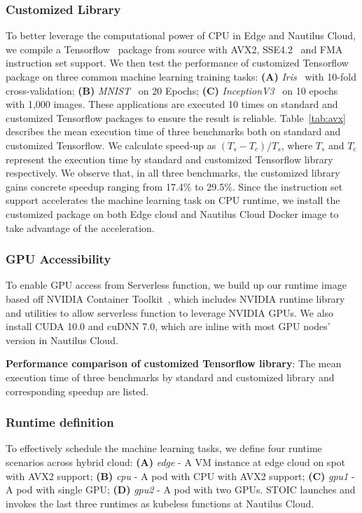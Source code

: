  \BlankLine
 \subsubsection{Customized Library}
 To better leverage the computational power of CPU in Edge and Nautilus Cloud, we compile a Tensorflow~\cite{ref:tensorflow} package from source with AVX2, SSE4.2~\cite{ref:avx} and FMA~\cite{ref:fma} instruction set support. We then test the performance of customized Tensorflow package on three common machine learning training tasks: \textbf{(A)} \textit{Iris}~\cite{ref:iris} with 10-fold cross-validation; \textbf{(B)} \textit{MNIST}~\cite{ref:mnist} on 20 Epochs; \textbf{(C)} \textit{InceptionV3}~\cite{ref:v3} on 10 epochs with 1,000 images. These applications are executed 10 times on standard and customized Tensorflow packages to ensure the result is reliable. Table~\ref{tab:avx} describes the mean execution time of three benchmarks both on standard and customized Tensorflow. We calculate speed-up as $(T_s - T_c) / T_s$, where $T_s$ and $T_c$ represent the execution time by standard and customized Tensorflow library respectively. We observe that, in all three benchmarks, the customized library gains concrete speedup ranging from 17.4\% to 29.5\%. Since the instruction set support accelerates the machine learning task on CPU runtime, we install the customized package on both Edge cloud and Nautilus Cloud Docker image to take advantage of the acceleration.
 
 \BlankLine
 \subsubsection{GPU Accessibility}
 To enable GPU access from Serverless function, we build up our runtime image based off NVIDIA Container Toolkit~\cite{ref:nvidia}, which includes NVIDIA runtime library and utilities to allow serverless function to leverage NVIDIA GPUs. We also install CUDA 10.0 and cuDNN 7.0, which are inline with most GPU nodes' version in Nautilus Cloud. 
 
\begin{table}[]
\centering

\caption{\textbf{Performance comparison of customized Tensorflow library}: The mean execution time of three benchmarks by standard and customized library and corresponding speedup are listed.  }
\label{tab:avx}
\end{table}
 
 \BlankLine
 \subsubsection{Runtime definition}
 To effectively schedule the machine learning tasks, we define four runtime scenarios across hybrid cloud: \textbf{(A)} \textit{edge} - A VM instance at edge cloud on spot with AVX2 support; \textbf{(B)} \textit{cpu} - A pod with CPU with AVX2 support; \textbf{(C)} \textit{gpu1} - A pod with single GPU; \textbf{(D)} \textit{gpu2} - A pod with two GPUs. STOIC launches and invokes the last three runtimes as kubeless functions at Nautilus Cloud. 
 
